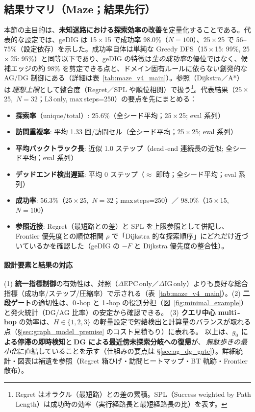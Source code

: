 \documentclass[ja=standard,xelatex]{bxjsarticle}
\begin{document}
\subsection*{結果サマリ（Maze；結果先行）}
\label{sec:maze_result_summary}
本節の主目的は、\textbf{未知迷路における探索効率の改善}を定量化することである。代表的な設定では、geDIG は 15\,\mbox{$\times$}\,15 で成功率 98.0\%（$N{=}100$）、25\,\mbox{$\times$}\,25 で 56--75\%（設定依存）を示した。成功率自体は単純な Greedy DFS（15\,\mbox{$\times$}\,15: 99\%, 25\,\mbox{$\times$}\,25: 95\%）と同等以下であり、geDIG の特徴は\emph{生の成功率}の優位ではなく、候補エッジの約 98\% を剪定できる点と、ドメイン固有ルールに依らない創発的な AG/DG 制御にある（詳細は表~\ref{tab:maze_v4_main}）。参照（Dijkstra／A*）は\,\emph{理想上限}として整合度（Regret／SPL や順位相関）で扱う\footnote{Regret はオラクル（最短路）との差の累積。SPL（Success weighted by Path Length）は成功時の効率（実行経路長と最短経路長の比）を表す。}。代表結果（25\,\mbox{$\times$}\,25, \,$N{=}32$；L3\,only, max\,steps=250）の要点を先にまとめる：
\begin{itemize}[leftmargin=1.4em]
  \item \textbf{探索率}（unique/total）: 25.6\%（全シード平均；25\,\mbox{$\times$}\,25; eval 系列）
  \item \textbf{訪問重複率}: 平均 1.33 回/訪問セル（全シード平均；25\,\mbox{$\times$}\,25; eval 系列）
  \item \textbf{平均バックトラック長}: 近似 1.0 ステップ（dead\,\mbox{-}end 連続長の近似; 全シード平均；eval 系列）
  \item \textbf{デッドエンド検出遅延}: 平均 0 ステップ（$\approx$ 即時；全シード平均；eval 系列）
  \item \textbf{成功率}: 56.3\%（25\,\mbox{$\times$}\,25, \,$N{=}32$；max\,steps=250）／ 98.0\%（15\,\mbox{$\times$}\,15, \,$N{=}100$）
  \item \textbf{参照近接}: Regret（最短路との差）と SPL を上限参照として併記し、Frontier 優先度との順位相関 $\rho$ で「Dijkstra 的な探索順序」にどれだけ近づいているかを確認した（geDIG の $-F$ と Dijkstra 優先度の整合性）。
\end{itemize}

\paragraph{設計要素と結果の対応}\; (1) \textbf{統一指標制御}の有効性は、対照（$\Delta$EPC\,only／$\Delta$IG\,only）よりも良好な総合指標（成功率/ステップ/圧縮率）で示される（表~\ref{tab:maze_v4_main}）。(2) \textbf{二段ゲート}の適切性は、0\,\mbox{-}hop と 1\,\mbox{-}hop の役割分担（図~\ref{fig:minimal_example}）と発火統計（DG/AG 比率）の安定から確認できる。 (3) \textbf{クエリ中心 multi\,\mbox{-}hop} の効率は、$H\in\{1,2,3\}$ の軽量設定で短絡検出と計算量のバランスが取れる点（§\ref{sec:graph_model_premise} のコスト見積もり）に表れる。
\noindent 以上は、\textbf{$g_0$ による停滞の即時検知}と\,\textbf{DG による最近傍未探索分岐への復帰}が、\,\emph{無駄歩きの最小化}に直結していることを示す（仕組みの要点は \S\ref{sec:ag_dg_gate}）。詳細統計・図表は補遺を参照（Regret 箱ひげ・訪問ヒートマップ・BT 軌跡・Frontier 散布）。
\end{document}
